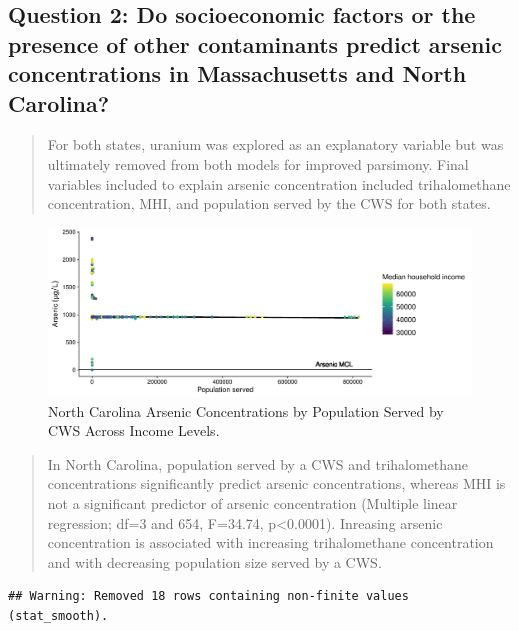 \documentclass[12pt,]{article}
\begin{document}
\hypertarget{question-2-do-socioeconomic-factors-or-the-presence-of-other-contaminants-predict-arsenic-concentrations-in-massachusetts-and-north-carolina}{%
\subsection{Question 2: Do socioeconomic factors or the presence of
other contaminants predict arsenic concentrations in Massachusetts and
North
Carolina?}\label{question-2-do-socioeconomic-factors-or-the-presence-of-other-contaminants-predict-arsenic-concentrations-in-massachusetts-and-north-carolina}}

\begin{quote}
For both states, uranium was explored as an explanatory variable but was
ultimately removed from both models for improved parsimony. Final
variables included to explain arsenic concentration included
trihalomethane concentration, MHI, and population served by the CWS for
both states.
\end{quote}

\begin{figure}
\centering
\includegraphics{Project_Template_files/figure-latex/figs9-1.pdf}
\caption{North Carolina Arsenic Concentrations by Population Served by
CWS Across Income Levels.}
\end{figure}

\begin{quote}
In North Carolina, population served by a CWS and trihalomethane
concentrations significantly predict arsenic concentrations, whereas MHI
is not a significant predictor of arsenic concentration (Multiple linear
regression; df=3 and 654, F=34.74, p\textless{}0.0001). Inreasing
arsenic concentration is associated with increasing trihalomethane
concentration and with decreasing population size served by a CWS.
\end{quote}

\begin{verbatim}
## Warning: Removed 18 rows containing non-finite values (stat_smooth).
\end{verbatim}
\end{document}
